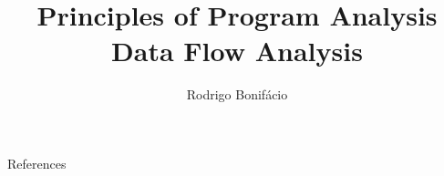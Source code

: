 \documentclass{beamer}
\title{Principles of Program Analysis \\ Data Flow Analysis}
\author{Rodrigo Bonif\'{a}cio}
\begin{document}
\begin{frame}
\titlepage
\end{frame}












\begin{frame}
\begin{block}{References}
\small


\end{block} 
\end{frame}
\end{document}
